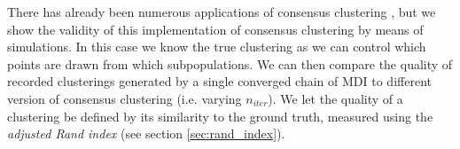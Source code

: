 \documentclass[12pt]{article} %
\begin{document}
	There has already been numerous applications of consensus clustering \cite{LiWeightedConsensusClustering2008} \cite{LancichinettiConsensusclusteringcomplex2012} \cite{BreimanRandomForests1}, but we show the validity of this implementation of consensus clustering by means of simulations. In this case we know the true clustering as we can control which points are drawn from which subpopulations. We can then compare the quality of recorded clusterings generated by a single converged chain of MDI to different version of consensus clustering (i.e. varying $n_{iter}$). We let the quality of a clustering be defined by its similarity to the ground truth, measured using the \emph{adjusted Rand index} (see section \ref{sec:rand_index}).
	


%	
	
	
\end{document}
